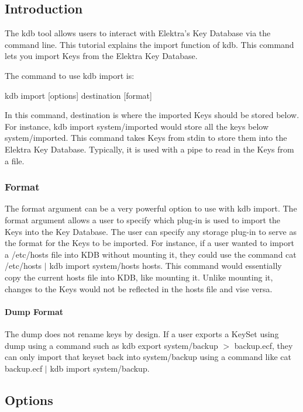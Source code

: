 \subsection*{Introduction}

The kdb tool allows users to interact with Elektra's Key Database via the command line. This tutorial explains the import function of kdb. This command lets you import Keys from the Elektra Key Database.

The command to use kdb import is\+: \begin{DoxyVerb}kdb import [options] destination [format]
\end{DoxyVerb}


In this command, destination is where the imported Keys should be stored below. For instance, {\ttfamily kdb import system/imported} would store all the keys below system/imported. This command takes Keys from stdin to store them into the Elektra Key Database. Typically, it is used with a pipe to read in the Keys from a file.

\subsubsection*{Format}

The format argument can be a very powerful option to use with kdb import. The format argument allows a user to specify which plug-\/in is used to import the Keys into the Key Database. The user can specify any storage plug-\/in to serve as the format for the Keys to be imported. For instance, if a user wanted to import a /etc/hosts file into K\+D\+B without mounting it, they could use the command {\ttfamily cat /etc/hosts $\vert$ kdb import system/hosts hosts}. This command would essentially copy the current hosts file into K\+D\+B, like mounting it. Unlike mounting it, changes to the Keys would not be reflected in the hosts file and vise versa.

\paragraph*{Dump Format}

The dump does not rename keys by design. If a user exports a Key\+Set using dump using a command such as {\ttfamily kdb export system/backup $>$ backup.\+ecf}, they can only import that keyset back into {\ttfamily system/backup} using a command like {\ttfamily cat backup.\+ecf $\vert$ kdb import system/backup}.

\subsection*{Options}

